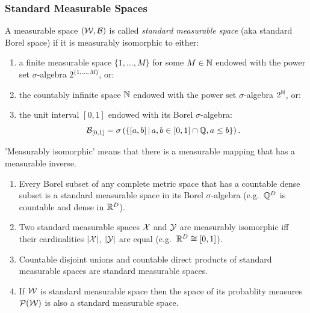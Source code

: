 \subsubsection{Standard Measurable Spaces}

\begin{Def}
 A measurable space $(\mathcal{W},\mathcal{B})$ is called \emph{standard measurable space} (aka standard Borel space) if it is measurably isomorphic to either:
    \begin{enumerate}
        \item a finite measurable space $\{1,\dots,M\}$ for some $M \in \mathbb{N}$ endowed with the power set $\sigma$-algebra $2^{\{1,\dots,M\}}$, or:
        \item the countably infinite space $\mathbb{N}$ endowed with the power set $\sigma$-algebra $2^{\mathbb{N}}$, or:
        \item the unit interval $[0,1]$ endowed with its Borel $\sigma$-algebra:
           \[\mathcal{B}_{[0,1]} =\sigma\left (\left \{ [a,b]\,|\, a, b \in [0,1] \cap \mathbb{Q}, a \le b \right \} \right ).\]
    \end{enumerate}
    'Measurably isomorphic' means that there is a measurable mapping that has a measurable inverse.
\end{Def}

\begin{Thm}[Kuratowski et al.]
    \begin{enumerate}
        \item Every Borel subset of any complete metric space that has a countable dense subset is a standard measurable space in its Borel $\sigma$-algebra 
    (e.g.\ $\mathbb{Q}^D$ is countable and dense in $\mathbb{R}^D$).
\item Two standard measurable spaces $\mathcal{X}$ and $\mathcal{Y}$ are measurably isomorphic iff their cardinalities $|\mathcal{X}|$, $|\mathcal{Y}|$ are equal 
    (e.g.\ $\mathbb{R}^D \cong [0,1]$).
\item Countable disjoint unions and countable direct products of standard measurable spaces are standard measurable spaces.
\item If $\mathcal{W}$ is standard measurable space then the space of its probablity measures $\mathcal{P}(\mathcal{W})$ is also a standard measurable space.
    \end{enumerate}
\end{Thm}

